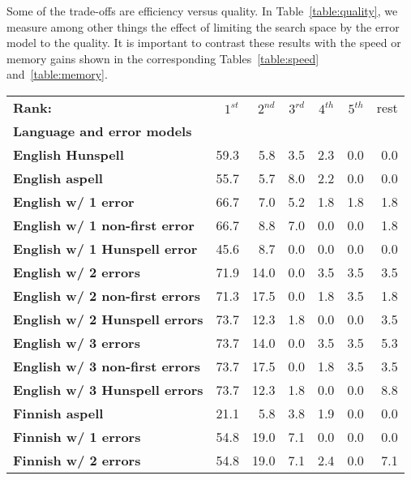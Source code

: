 \documentclass[a4paper,12pt]{article}
\begin{document}
Some of the trade-offs are efficiency versus quality. In
Table~\ref{table:quality}, we measure among other things the effect of limiting the
search space by the error model to the quality. It is important to contrast
these results with the speed or memory gains shown in the corresponding
Tables~\ref{table:speed} and~\ref{table:memory}.

\begin{table}
    \centering
    \begin{tabular}{|l|r|r|r|r|r|r|}
        \hline
        \bf Rank: & $1^{st}$ & $2^{nd}$ & $3^{rd}$ & $4^{th}$ & $5^{th}$ & rest \\
        \bf Language and error models & & & & & & \\
        \hline
        \bf English Hunspell & 59.3 & 5.8 & 3.5 & 2.3 & 0.0 & 0.0 \\
          \bf English aspell & 55.7 & 5.7 & 8.0 & 2.2 & 0.0 & 0.0 \\
        \hline
        \bf English w/ 1 error & 66.7 & 7.0 & 5.2 & 1.8 & 1.8 & 1.8 \\
 \bf English w/ 1 non-first error & 66.7 & 8.8 & 7.0 & 0.0 & 0.0 & 1.8 \\
 \bf English w/ 1 Hunspell error & 45.6 & 8.7 & 0.0 & 0.0 & 0.0 & 0.0 \\
     \bf English w/ 2 errors & 71.9 & 14.0 & 0.0 & 3.5 & 3.5 & 3.5 \\
 \bf English w/ 2 non-first errors & 71.3 & 17.5 & 0.0 & 1.8 & 3.5 & 1.8 \\
 \bf English w/ 2 Hunspell errors & 73.7 & 12.3 & 1.8 & 0.0 & 0.0 & 3.5 \\
   \bf English w/ 3 errors & 73.7 & 14.0 & 0.0 & 3.5 & 3.5 & 5.3 \\
 \bf English w/ 3 non-first errors & 73.7 & 17.5 & 0.0 & 1.8 & 3.5 & 3.5 \\
 \bf English w/ 3 Hunspell errors & 73.7 & 12.3 & 1.8 & 0.0 & 0.0 & 8.8 \\
        \hline
       \bf Finnish aspell & 21.1 & 5.8 & 3.8 & 1.9 & 0.0 & 0.0 \\
        \bf Finnish w/ 1 errors & 54.8 & 19.0 & 7.1 & 0.0 & 0.0 & 0.0 \\
        \bf Finnish w/ 2 errors & 54.8 & 19.0 & 7.1 & 2.4 & 0.0 & 7.1 \\

\end{tabular}
\end{table}
\end{document}
